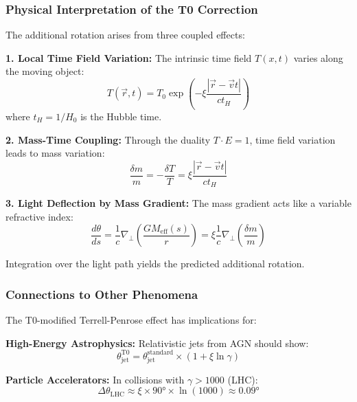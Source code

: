 	\subsubsection{Physical Interpretation of the T0 Correction}
	
	The additional rotation arises from three coupled effects:
	
	\textbf{1. Local Time Field Variation:}
	The intrinsic time field $T(x,t)$ varies along the moving object:
	\begin{equation}
		T(\vec{r}, t) = T_0 \exp\left(-\xi \frac{|\vec{r} - \vec{v}t|}{ct_H}\right)
	\end{equation}
	where $t_H = 1/H_0$ is the Hubble time.
	
	\textbf{2. Mass-Time Coupling:}
	Through the duality $T \cdot E = 1$, time field variation leads to mass variation:
	\begin{equation}
		\frac{\delta m}{m} = -\frac{\delta T}{T} = \xi \frac{|\vec{r} - \vec{v}t|}{ct_H}
	\end{equation}
	
	\textbf{3. Light Deflection by Mass Gradient:}
	The mass gradient acts like a variable refractive index:
	\begin{equation}
		\frac{d\theta}{ds} = \frac{1}{c} \nabla_\perp \left(\frac{GM_{\text{eff}}(s)}{r}\right) = \xi \frac{1}{c} \nabla_\perp \left(\frac{\delta m}{m}\right)
	\end{equation}
	
	Integration over the light path yields the predicted additional rotation.
	
	\subsubsection{Connections to Other Phenomena}
	
	The T0-modified Terrell-Penrose effect has implications for:
	
	\textbf{High-Energy Astrophysics:}
	Relativistic jets from AGN should show:
	\begin{equation}
		\theta_{\text{jet}}^{\text{T0}} = \theta_{\text{jet}}^{\text{standard}} \times (1 + \xi \ln\gamma)
	\end{equation}
	
	\textbf{Particle Accelerators:}
	In collisions with $\gamma > 1000$ (LHC):
	\begin{equation}
		\Delta\theta_{\text{LHC}} \approx \xi \times 90° \times \ln(1000) \approx 0.09°
	\end{equation}
	
